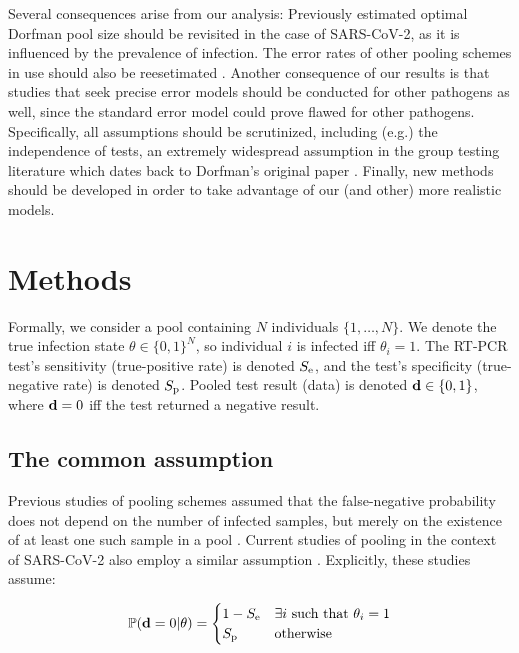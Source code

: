 \documentclass{article}
\begin{document}
Several consequences arise from our analysis: Previously estimated optimal Dorfman
pool size \cite{OptimalDorfmanPool} should be revisited in the case of SARS-CoV-2, as it is influenced by the prevalence of infection. The error
rates of other pooling schemes in use should also be reesetimated
\cite{BayesianDorfman, Kim}. Another consequence of our results is that studies that seek precise error models should be conducted for other pathogens as well, since the standard error model could prove flawed for other pathogens. Specifically, all assumptions should be scrutinized, including (e.g.) the independence of tests, an extremely widespread assumption in the group testing literature \cite{Kim, OptimalDorfmanPool} which dates back to Dorfman's original paper \cite{DorfmanOriginal}. Finally, new methods should be developed in order to take advantage of our (and other) more realistic models.

\section*{Methods}
Formally, we consider a pool containing $N$ individuals
$\{1,\dots,N\}$. We denote the true infection state $\theta \in
\{0,1\}^N$, so individual $i$ is infected iff $\theta_i=1$. The RT-PCR
test's sensitivity (true-positive rate) is denoted $S_{\text{e}}$, and the
test's specificity (true-negative rate) is denoted $S_{\text{p}}$. Pooled
test result (data) is denoted $\mathbf{d} \in \{0,1\}$, where $\mathbf{d}=0$ iff
the test returned a negative result.

\subsection*{The common assumption}\label{subsec:common}
Previous studies of pooling schemes assumed that the false-negative
probability does not depend on the number of infected samples, but
merely on the existence of at least one such sample in a pool
\cite{Kim, OptimalDorfmanPool}. Current studies of pooling in the
context of SARS-CoV-2 also employ a similar assumption
\cite{Simplistic1, Simplistic2}. Explicitly, these studies assume:

\begin{align}\label{eq:common}
  \mathbb{P}(\mathbf{d}=0|\theta) = 
  \begin{cases} 
    1-S_{\text{e}} & \exists i\ \text{such that } \theta_i = 1\\
    S_{\text{p}} & \text{otherwise}
  \end{cases} 
\end{align}
\end{document}
